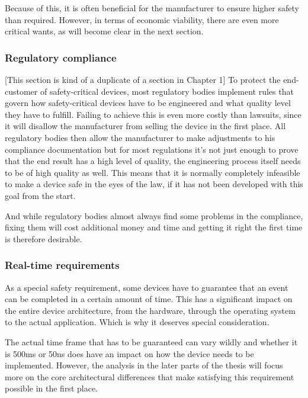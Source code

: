 Because of this, it is often beneficial for the manufacturer to ensure higher safety than required. However, in terms of economic viability, there are even more critical wants, as will become clear in the next section.

\subsubsection{Regulatory compliance}
[This section is kind of a duplicate of a section in Chapter 1]
To protect the end-customer of safety-critical devices, most regulatory bodies implement rules that govern how safety-critical devices have to be engineered and what quality level they have to fulfill.
Failing to achieve this is even more costly than lawsuits, since it will disallow the manufacturer from selling the device in the first place. All regulatory bodies then allow the manufacturer to make adjustments to his compliance documentation but for most regulations it’s not just enough to prove that the end result has a high level of quality, the engineering process itself needs to be of high quality as well. This means that it is normally completely infeasible to make a device safe in the eyes of the law, if it has not been developed with this goal from the start. 

And while regulatory bodies almost always find some problems in the compliance, fixing them will cost additional money and time and getting it right the first time is therefore desirable.

\subsubsection{Real-time requirements}
As a special safety requirement, some devices have to guarantee that an event can be completed in a certain amount of time. This has a significant impact on the entire device architecture, from the hardware, through the operating system to the actual application. Which is why it deserves special consideration.

The actual time frame that has to be guaranteed can vary wildly and whether it is 500ms or 50ns does have an impact on how the device needs to be implemented. However, the analysis in the later parts of the thesis will focus more on the core architectural differences that make satisfying this requirement possible in the first place. 

